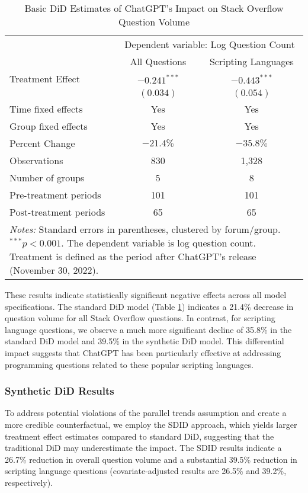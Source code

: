 \begin{table}[H]
    \centering
    \caption{Basic DiD Estimates of ChatGPT's Impact on Stack Overflow Question Volume}
    \label{tab:did_results}
    \begin{tabular}{lcc}
        \toprule
            & \multicolumn{2}{c}{Dependent variable: Log Question Count} \\
            \cmidrule(lr){2-3}
            & All Questions & Scripting Languages \\
        \midrule
            Treatment Effect & $-0.241^{***}$ & $-0.443^{***}$ \\
            & $(0.034)$ & $(0.054)$ \\
        \midrule
            Time fixed effects & Yes & Yes \\
            Group fixed effects & Yes & Yes \\
            Percent Change & $-21.4\%$ & $-35.8\%$ \\
        \midrule
            Observations & 830 & 1,328 \\
            Number of groups & 5 & 8 \\
            Pre-treatment periods & 101 & 101 \\
            Post-treatment periods & 65 & 65 \\
        \bottomrule
            \multicolumn{3}{p{0.95\linewidth}}{\footnotesize \textit{Notes:} Standard errors in parentheses, clustered by forum/group. $^{***}p<0.001$. The dependent variable is log question count. Treatment is defined as the period after ChatGPT's release (November 30, 2022).} \\
    \end{tabular}
\end{table}

These results indicate statistically significant negative effects across all model specifications. The standard DiD model (Table \ref{tab:did_results}) indicates a 21.4\% decrease in question volume for all Stack Overflow questions. In contrast, for scripting language questions, we observe a much more significant decline of 35.8\% in the standard DiD model and 39.5\% in the synthetic DiD model. This differential impact suggests that ChatGPT has been particularly effective at addressing programming questions related to these popular scripting languages.


\subsubsection{Synthetic DiD Results}
To address potential violations of the parallel trends assumption and create a more credible counterfactual, we employ the SDID approach, which yields larger treatment effect estimates compared to standard DiD, suggesting that the traditional DiD may underestimate the impact. The SDID results indicate a 26.7\% reduction in overall question volume and a substantial 39.5\% reduction in scripting language questions (covariate-adjusted results are 26.5\% and 39.2\%, respectively).\\

